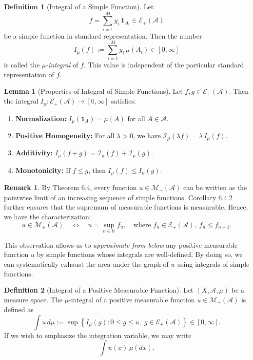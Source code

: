 \documentclass[12pt]{article}
\theoremstyle{definition}
\newtheorem{definition}{Definition}[section]
\newtheorem{lemma}[theorem]{Lemma}
\newtheorem{remark}{Remark}[section]
\begin{document}
\medskip
\begin{definition}[Integral of a Simple Function]
Let 
\[
f = \sum_{i=1}^{M} y_i \, \mathbf{1}_{A_i} \in \mathcal{E}_+(\mathcal{A})
\]
be a simple function in standard representation. Then the number
\[
I_\mu(f) := \sum_{i=1}^{M} y_i \, \mu(A_i) \in [0, \infty]
\]
is called the \emph{\( \mu \)-integral} of \( f \).  
This value is independent of the particular standard representation of \( f \).
\end{definition}

\medskip
\begin{lemma}[Properties of Integral of Simple Functions]
Let \( f, g \in \mathcal{E}_+(\mathcal{A}) \). Then the integral \( I_\mu : \mathcal{E}_+(\mathcal{A}) \to [0, \infty] \) satisfies:
\begin{enumerate}[label=(\roman*)]
    \item \textbf{Normalization:} \( I_\mu(\mathbf{1}_A) = \mu(A) \) for all \( A \in \mathcal{A} \).
    \item \textbf{Positive Homogeneity:} For all \( \lambda > 0 \), we have \( \mathcal{I}_\mu(\lambda f) = \lambda \, I_\mu(f) \).
    \item \textbf{Additivity:} \( I_\mu(f + g) = \mathcal{I}_\mu(f) + \mathcal{I}_\mu(g) \).
    \item \textbf{Monotonicity:} If \( f \leq g \), then \( I_\mu(f) \leq I_\mu(g) \).
\end{enumerate}
\end{lemma}

\medskip
\begin{remark}
By Theorem 6.4, every function \( u \in \mathcal{M}_+(\mathcal{A}) \) can be written as the pointwise limit of an increasing sequence of simple functions. Corollary 6.4.2 further ensures that the supremum of measurable functions is measurable. Hence, we have the characterization:
\[
u \in \mathcal{M}_+(\mathcal{A}) \quad \Longleftrightarrow \quad u = \sup_{n \in \mathbb{N}} f_n, \quad \text{where } f_n \in \mathcal{E}_+(\mathcal{A}), \; f_n \leq f_{n+1}.
\]

This observation allows us to \emph{approximate from below} any positive measurable function \( u \) by simple functions whose integrals are well-defined. By doing so, we can systematically exhaust the area under the graph of \( u \) using integrals of simple functions.
\end{remark}

\medskip
\begin{definition}[Integral of a Positive Measurable Function]
Let \( (X, \mathcal{A}, \mu) \) be a measure space. The \(\mu\)-integral of a positive measurable function \( u \in \mathcal{M}_+(\mathcal{A}) \) is defined as
\[
\int u \, d\mu := \sup \left\{ I_\mu(g) : 0 \leq g \leq u,\; g \in \mathcal{E}_+(\mathcal{A}) \right\} \in [0, \infty].
\]
If we wish to emphasize the integration variable, we may write
\[
\int u(x) \, \mu(dx).
\]
\end{definition}
\end{document}
